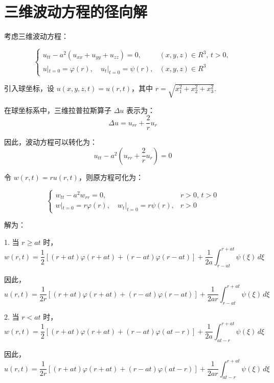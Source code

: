 \section{三维波动方程的径向解}

考虑三维波动方程：

\[
\begin{cases}
u_{tt} - a^2 (u_{xx} + u_{yy} + u_{zz}) = 0, & (x, y, z) \in R^3, \, t > 0, \\[5pt]
u|_{t=0} = \varphi(r), \quad u_t|_{t=0} = \psi(r), & (x, y, z) \in R^3
\end{cases}
\]

引入球坐标，设 $u(x, y, z, t) = u(r, t)$，其中 $r = \sqrt{x_1^2 + x_2^2 + x_3^2}$.

在球坐标系中，三维拉普拉斯算子 \( \Delta u \) 表示为：
\[
\Delta u = u_{rr} + \frac{2}{r} u_r
\]

因此，波动方程可以转化为：
\[
u_{tt} - a^2 \left( u_{rr} + \frac{2}{r} u_r \right) = 0
\]

令 $w(r, t) = r u(r, t)$，则原方程可化为：

\[
\begin{cases}
w_{tt} - a^2 w_{rr} = 0, & r > 0, \, t > 0 \\
w|_{t=0} = r \varphi(r), \quad w_t|_{t=0} = r \psi(r), & r > 0
\end{cases}
\]

解为：

1. 当 \( r \geq at \) 时，
   \[
   w(r, t) = \frac{1}{2} \left[ (r+at) \varphi(r+at) + (r-at) \varphi(r-at) \right] + \frac{1}{2a} \int_{r-at}^{r+at} \psi(\xi) \, d\xi
   \]

   因此，
   \[
   u(r, t) = \frac{1}{2r} \left[ (r+at) \varphi(r+at) + (r-at) \varphi(r-at) \right] + \frac{1}{2ar} \int_{r-at}^{r+at} \psi(\xi) \, d\xi
   \]

2. 当 \( r < at \) 时，
   \[
   w(r, t) = \frac{1}{2} \left[ (r+at) \varphi(r+at) + (r-at) \varphi(at - r) \right] + \frac{1}{2a} \int_{at - r}^{r+at} \psi(\xi) \, d\xi
   \]

   因此，
   \[
   u(r, t) = \frac{1}{2r} \left[ (r+at) \varphi(r+at) + (r-at) \varphi(at - r) \right] + \frac{1}{2ar} \int_{at - r}^{r+at} \psi(\xi) \, d\xi
   \]

